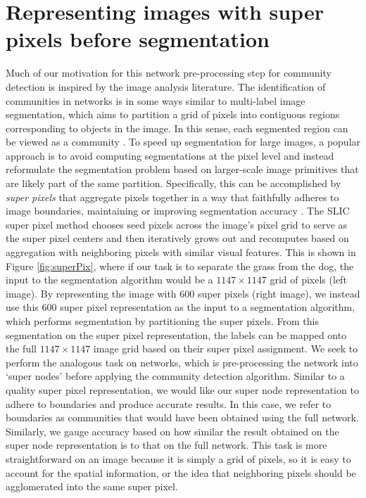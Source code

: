 \section{Representing images with super pixels before segmentation}
Much of our motivation for this network pre-processing step for community detection is inspired by the image analysis literature. The identification of communities in networks is in some ways similar to multi-label image segmentation, which aims to partition a grid of pixels into contiguous regions corresponding to objects in the image. In this sense, each segmented region can be viewed as a community \cite{browet}. To speed up segmentation for large images, a popular approach is to avoid computing segmentations at the pixel level and instead reformulate the segmentation problem based on larger-scale image primitives that are likely part of the same partition. Specifically, this can be accomplished by {\it super pixels} that aggregate pixels together in a way that faithfully adheres to image boundaries, maintaining or improving segmentation accuracy \cite{slic}. The SLIC super pixel method \cite{slic} chooses seed pixels across the image's pixel grid to serve as the super pixel centers and then iteratively grows out and recomputes based on aggregation with neighboring pixels with similar visual features. This is shown in Figure \ref{fig:superPix}, where if our task is to separate the grass from the dog, the input to the segmentation algorithm would be a $1147 \times 1147$ grid of pixels (left image). By representing the image with 600 super pixels (right image), we instead use this 600 super pixel representation as the input to a segmentation algorithm, which performs segmentation by partitioning the super pixels. From this segmentation on the super pixel representation, the labels can be mapped onto the full $1147 \times 1147$ image grid based on their super pixel assignment. We seek to perform the analogous task on networks, which is pre-processing the network into `super nodes' before applying the community detection algorithm. Similar to a quality super pixel representation, we would like our super node representation to adhere to boundaries and produce accurate results. In this case, we refer to boundaries as communities that would have been obtained using the full network. Similarly, we gauge accuracy based on how similar the result obtained on the super node representation is to that on the full network. This task is more straightforward on an image because it is simply a grid of pixels, so it is easy to account for the spatial information, or the idea that neighboring pixels should be agglomerated into the same super pixel. 


